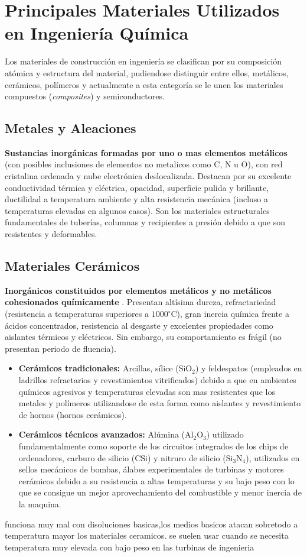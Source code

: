 
\section{Principales Materiales Utilizados en Ingeniería Química}

Los materiales de construcción en ingeniería se clasifican por su composición atómica y estructura del material, pudiendose distinguir entre ellos, metálicos, cerámicos, polímeros y actualmente a esta categoría se le unen los materiales compuestos (\textit{composites}) y semiconductores.

\subsection{Metales y Aleaciones}
\textbf{Sustancias inorgánicas formadas por uno o mas elementos metálicos} (con posibles inclusiones de elementos no metalicos como C, N u O), con red cristalina ordenada y nube electrónica deslocalizada. Destacan por su excelente conductividad térmica y eléctrica, opacidad, superficie pulida y brillante, ductilidad a temperatura ambiente y alta resistencia mecánica (incluso a temperaturas elevadas en algunos casos). Son los materiales estructurales fundamentales de tuberías, columnas y recipientes a presión debido a que son resistentes y deformables.

\subsection{Materiales Cerámicos}
\textbf{Inorgánicos constituidos por elementos metálicos y no metálicos cohesionados químicamente} . Presentan altísima dureza, refractariedad (resistencia a temperaturas superiores a $1000^\circ\text{C}$), gran inercia química frente a ácidos concentrados, resistencia al desgaste y excelentes propiedades como aislantes térmicos y eléctricos. Sin embargo, su comportamiento es frágil (no presentan periodo de fluencia).
\begin{itemize}
    \item \textbf{Cerámicos tradicionales:} Arcillas, sílice ($\text{SiO}_2$) y feldespatos (empleados en ladrillos refractarios y revestimientos vitrificados) debido a que en ambientes químicos agresivos y temperaturas elevadas son mas resistentes que los metales y polímeros utilizandose de esta forma como aislantes y revestimiento de hornos (hornos cerámicos).
    \item \textbf{Cerámicos técnicos avanzados:} Alúmina ($\text{Al}_2\text{O}_3$) utilizado fundamentalmente como soporte de los circuitos integrados de los chips de ordenadores, carburo de silicio ($\text{CSi}$) y nitruro de silicio ($\text{Si}_3\text{N}_4$), utilizados en sellos mecánicos de bombas, álabes experimentales de turbinas y motores cerámicos debido a su resistencia a altas temperaturas y su bajo peso con lo que se consigue un mejor aprovechamiento del combustible y menor inercia de la maquina.
\end{itemize}
funciona muy mal con disoluciones basicas,los medios basicos atacan sobretodo a temperatura mayor los materiales ceramicos. se suelen usar cuando se necesita temperatura muy elevada con bajo peso en las turbinas de ingenieria
